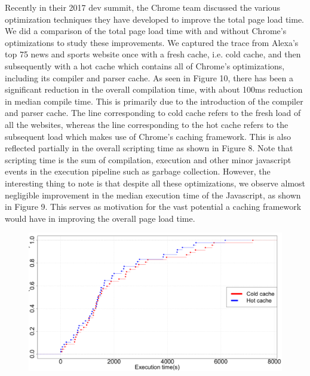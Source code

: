 Recently in their 2017 dev summit, the Chrome team discussed the various optimization techniques
they have developed to improve the total page load time.
We did a comparison of the total page load time with and without Chrome's optimizations to study
these improvements. We captured the trace from Alexa's top 75 
news and sports website once with a fresh cache, i.e. cold cache, and then subsequently with a hot
cache which contains all of Chrome's optimizations, including its compiler and parser cache. 
As seen in Figure 10, there has been a significant reduction in the overall compilation
time, with about 100ms reduction in median compile time. This is primarily due to the introduction of the compiler and parser cache. 
The line corresponding to cold cache refers to the fresh load of all the websites,
whereas the line corresponding to the hot cache refers to the subsequent load
which makes use of Chrome's caching framework. 
This is also reflected partially in the overall scripting time
as shown in Figure 8. Note that scripting time is the sum of compilation, execution and other
minor javascript events in the execution pipeline such as garbage collection. 
However, the interesting thing to note is that despite all these optimizations,
we observe almost negligible improvement in the median execution time of the Javascript, as
shown in Figure 9. This serves as motivation for the vast potential a caching framework would have in
improving the overall page load time.

\begin{figure}[t]
\centering
\includegraphics[width=0.9\columnwidth]{figs/chrome_exec.png}
\label{fig:compile_p2}
\end{figure}

